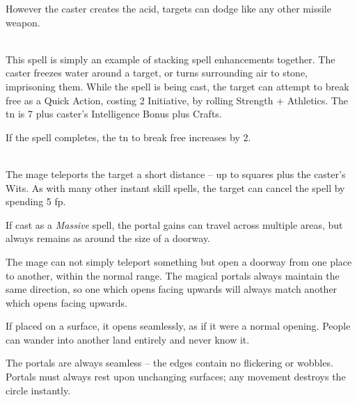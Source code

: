 \begin{multicols}{2}
However the caster creates the acid, targets can dodge like any other missile weapon.

\\
This spell is simply an example of stacking spell enhancements together.  The caster freezes water around a target, or turns surrounding air to stone, imprisoning them.
While the spell is being cast, the target can attempt to break free as a Quick Action, costing 2 Initiative, by rolling Strength + Athletics.
The \gls{tn} is 7 plus caster's Intelligence Bonus plus Crafts.

If the spell completes, the \gls{tn} to break free increases by 2.

\spelllevel

\\
The mage teleports the target a short distance -- up to  squares plus the caster's Wits.  As with many other instant skill spells, the target can cancel the spell by spending 5 \gls{fp}.

If cast as a \textit{Massive} spell, the portal gains can travel across multiple areas, but always remains as around the size of a doorway.

The mage can not simply teleport something but open a doorway from one place to another, within the normal range.
The magical portals always maintain the same direction, so one which opens facing upwards will always match another which opens facing upwards.

If placed on a surface, it opens seamlessly, as if it were a normal opening.
People can wander into another land entirely and never know it.

The portals are always seamless -- the edges contain no flickering or wobbles.
Portals must always rest upon unchanging surfaces; any movement destroys the circle instantly.

\end{multicols}


